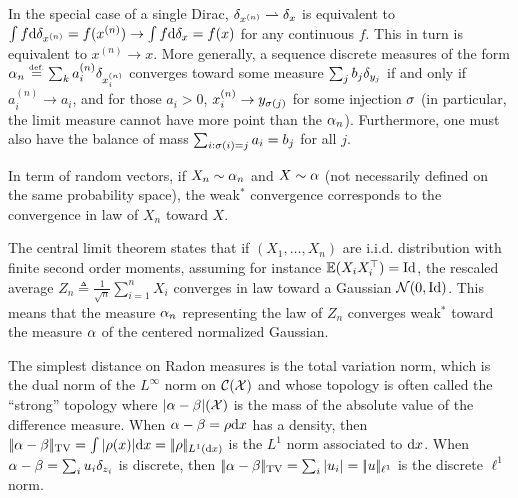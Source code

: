 \begin{rem}\label{rem-weak-conv-disc}
In the special case of a single Dirac, $\delta_{x^{(n)}} \rightharpoonup \delta_x$ is equivalent to $\int f \mathrm{d}\delta_{x^{(n)}} = f(x^{(n)}) \rightarrow \int f \mathrm{d}\delta_{x} = f(x)$ for any continuous $f$. This in turn is equivalent to $x^{(n)} \rightarrow x$. More generally, a sequence discrete measures of the form $\alpha_n \stackrel{\mbox{\upshape\tiny def.}}{=} \sum_k a_i^{(n)} \delta_{ x_i^{(n)} }$ converges toward some measure $\sum_j b_j \delta_{y_j}$ if and only if $a_i^{(n)} \rightarrow a_i$, and for those $a_i>0$, $x_i^{(n)} \rightarrow y_{\sigma(j)}$ for some injection $\sigma$ (in particular, the limit measure cannot have more point than the $\alpha_n$). Furthermore, one must also have the balance of mass $\sum_{i : \sigma(i)=j} a_i = b_j$ for all $j$.

\end{rem}

In term of random vectors, if $X_n \sim \alpha_n$ and $X \sim \alpha$ (not necessarily defined on the same probability space), the weak$^*$ convergence corresponds to the convergence in law of $X_n$ toward $X$.

\begin{rem}\label{rem-clt}
	The central limit theorem states that if $(X_1,\ldots,X_n)$ are i.i.d. distribution with finite second order moments, assuming for instance $\mathbb{E}(X_i X_i^\top)=\mathrm{Id}$, the rescaled average $Z_n \triangleq \frac{1}{\sqrt{n}} \sum_{i=1}^n X_i$ converges in law toward a Gaussian $\mathcal{N}(0,\mathrm{Id})$. This means that the measure $\alpha_n$ representing the law of $Z_n$ converges weak$^*$ toward the measure $\alpha$ of the centered normalized Gaussian.
\end{rem}

\begin{defn}
The simplest distance on Radon measures is the total variation norm, which is the dual norm of the $L^\infty$ norm on $\mathcal{C}(\mathcal{X})$ and whose topology is often called the ``strong'' topology
where $|\alpha-\beta|(\mathcal{X})$ is the mass of the absolute value of the difference measure. When $\alpha-\beta=\rho \mathrm{d} x$ has a density, then $|\!| \alpha-\beta |\!|_{\operatorname{TV}}=\int |\rho(x)| \mathrm{d} x=|\!| \rho |\!|_{L^1(\mathrm{d} x)}$ is the $L^1$ norm associated to $\mathrm{d} x$. When $\alpha-\beta=\sum_i u_i \delta_{z_i}$ is discrete, then $|\!| \alpha-\beta |\!|_{\operatorname{TV}}=\sum_i |u_i|=|\!| u |\!|_{\ell^1}$ is the discrete $\ell^1$ norm. 
\end{defn}

